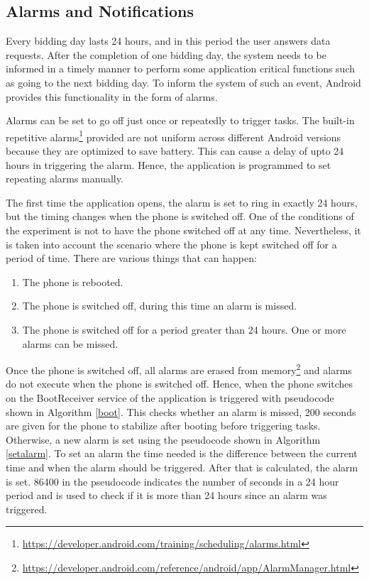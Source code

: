 \subsection{Alarms and Notifications} \label{alarm}

Every bidding day lasts 24 hours, and in this period the user answers data requests. After the completion of one bidding day, the system needs to be informed in a timely manner to perform some application critical functions such as going to the next bidding day. To inform the system of such an event, Android provides this functionality in the form of alarms. 

Alarms can be set to go off just once or repeatedly to trigger tasks.
The built-in repetitive alarms\footnote{\url{https://developer.android.com/training/scheduling/alarms.html}} provided are not uniform across different Android versions because they are optimized to save battery. This can cause a delay of upto 24 hours in triggering the alarm. Hence, the application is programmed to set repeating alarms manually. 

The first time the application opens, the alarm is set to ring in exactly 24 hours, but the timing changes when the phone is switched off.
One of the conditions of the experiment is not to have the phone switched off at any time. Nevertheless, it is taken into account the scenario where
the phone is kept switched off for a period of time. There are various things that can happen:

\begin{enumerate}
	\item The phone is rebooted.
	\item The phone is switched off, during this time an alarm is missed.
    \item The phone is switched off for a period greater than 24 hours. One or more alarms can be missed.
\end{enumerate}

Once the phone is switched off, all alarms are erased from memory\footnote{\url{https://developer.android.com/reference/android/app/AlarmManager.html}} and alarms do not execute when the phone is switched off. Hence, when the phone switches on the
BootReceiver service of the application is triggered with pseudocode shown in Algorithm \ref{boot}. This checks whether an alarm is missed, 200 seconds are given for the phone to stabilize after booting before triggering tasks. Otherwise, a new alarm is set using the pseudocode shown in Algorithm \ref{setalarm}. To set an alarm the time needed is the difference between the current time and when the alarm should be triggered. After that is calculated, the alarm is set. 86400 in the pseudocode indicates the number of seconds in a 24 hour period and is used to check if it is more than 24 hours since an alarm was triggered.

